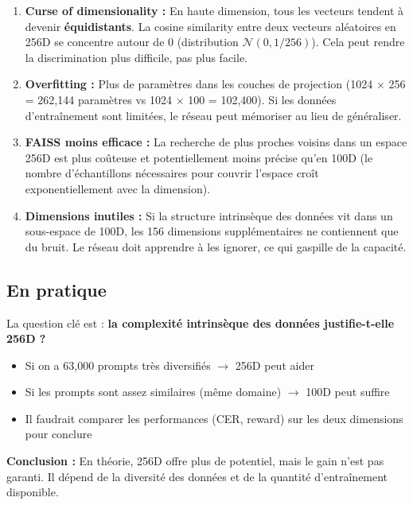 \documentclass[11pt,a4paper]{article}
\begin{document}
\begin{enumerate}
    \item \textbf{Curse of dimensionality :} En haute dimension, tous les vecteurs tendent à devenir \textbf{équidistants}. La cosine similarity entre deux vecteurs aléatoires en 256D se concentre autour de 0 (distribution $\mathcal{N}(0, 1/256)$). Cela peut rendre la discrimination plus difficile, pas plus facile.
    
    \item \textbf{Overfitting :} Plus de paramètres dans les couches de projection (1024 $\times$ 256 = 262{,}144 paramètres vs 1024 $\times$ 100 = 102{,}400). Si les données d'entraînement sont limitées, le réseau peut mémoriser au lieu de généraliser.
    
    \item \textbf{FAISS moins efficace :} La recherche de plus proches voisins dans un espace 256D est plus coûteuse et potentiellement moins précise qu'en 100D (le nombre d'échantillons nécessaires pour couvrir l'espace croît exponentiellement avec la dimension).
    
    \item \textbf{Dimensions inutiles :} Si la structure intrinsèque des données vit dans un sous-espace de 100D, les 156 dimensions supplémentaires ne contiennent que du bruit. Le réseau doit apprendre à les ignorer, ce qui gaspille de la capacité.
\end{enumerate}

\subsection{En pratique}

La question clé est : \textbf{la complexité intrinsèque des données justifie-t-elle 256D ?}

\begin{itemize}
    \item Si on a 63{,}000 prompts très diversifiés $\rightarrow$ 256D peut aider
    \item Si les prompts sont assez similaires (même domaine) $\rightarrow$ 100D peut suffire
    \item Il faudrait comparer les performances (CER, reward) sur les deux dimensions pour conclure
\end{itemize}

\textbf{Conclusion :} En théorie, 256D offre plus de potentiel, mais le gain n'est pas garanti. Il dépend de la diversité des données et de la quantité d'entraînement disponible.
\end{document}
